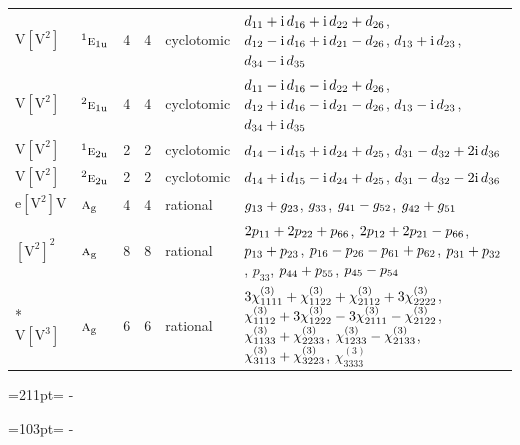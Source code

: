 \documentclass[10pt,a4paper]{article}
\newcommand{\needspace}[1]{\par\penalty-100\begingroup\dimen0=#1\relax\dimen2=\pagegoal
  \advance\dimen2-\pagetotal\ifdim\dimen0>\dimen2\relax\ifdim\dimen2>0pt\vfil\break\fi\fi
  \endgroup}
\numberwithin{equation}{section}
\newcommand{\irr}[1]{\text{\normalfont\scshape #1}}
\newcommand{\conjpair}[1]{{}^{#1}}
\newcommand{\ptag}[1]{\mathrm{#1}}
\newcommand{\iunit}{\mathrm{i}}
\newcommand{\jahn}[1]{\mathrm{#1}}
\newlength{\fillwidth}\newlength{\cellwidth}\newlength{\colwidth}
\newcommand{\signbreak}{\penalty100\relax}
\begin{document}
{\begin{longtable}{@{}llrrl>{\RaggedRight\arraybackslash}p{\fillwidth}@{}}
$\jahn{V[V^{2}]}$ & $\conjpair{1}\irr{e}_{1\ptag{u}}$ & 4 & 4 & cyclotomic & $d_{11} +\signbreak \iunit{}\,d_{16} +\signbreak \iunit{}\,d_{22} +\signbreak d_{26}$, $d_{12} -\signbreak \iunit{}\,d_{16} +\signbreak \iunit{}\,d_{21} -\signbreak d_{26}$, $d_{13} +\signbreak \iunit{}\,d_{23}$, $d_{34} -\signbreak \iunit{}\,d_{35}$\\
$\jahn{V[V^{2}]}$ & $\conjpair{2}\irr{e}_{1\ptag{u}}$ & 4 & 4 & cyclotomic & $d_{11} -\signbreak \iunit{}\,d_{16} -\signbreak \iunit{}\,d_{22} +\signbreak d_{26}$, $d_{12} +\signbreak \iunit{}\,d_{16} -\signbreak \iunit{}\,d_{21} -\signbreak d_{26}$, $d_{13} -\signbreak \iunit{}\,d_{23}$, $d_{34} +\signbreak \iunit{}\,d_{35}$\\
$\jahn{V[V^{2}]}$ & $\conjpair{1}\irr{e}_{2\ptag{u}}$ & 2 & 2 & cyclotomic & $d_{14} -\signbreak \iunit{}\,d_{15} +\signbreak \iunit{}\,d_{24} +\signbreak d_{25}$, $d_{31} -\signbreak d_{32} +\signbreak 2\iunit{}\,d_{36}$\\
$\jahn{V[V^{2}]}$ & $\conjpair{2}\irr{e}_{2\ptag{u}}$ & 2 & 2 & cyclotomic & $d_{14} +\signbreak \iunit{}\,d_{15} -\signbreak \iunit{}\,d_{24} +\signbreak d_{25}$, $d_{31} -\signbreak d_{32} -\signbreak 2\iunit{}\,d_{36}$\\
$\jahn{e[V^{2}]V}$ & $\irr{a}_{\ptag{g}}$ & 4 & 4 & rational & $\mathnormal{g}_{13} +\signbreak \mathnormal{g}_{23}$, $\mathnormal{g}_{33}$, $\mathnormal{g}_{41} -\signbreak \mathnormal{g}_{52}$, $\mathnormal{g}_{42} +\signbreak \mathnormal{g}_{51}$\\
$\jahn{[V^{2}]^{2}}$ & $\irr{a}_{\ptag{g}}$ & 8 & 8 & rational & $2p_{11} +\signbreak 2p_{22} +\signbreak p_{66}$, $2p_{12} +\signbreak 2p_{21} -\signbreak p_{66}$, $p_{13} +\signbreak p_{23}$, $p_{16} -\signbreak p_{26} -\signbreak p_{61} +\signbreak p_{62}$, $p_{31} +\signbreak p_{32}$, $p_{33}$, $p_{44} +\signbreak p_{55}$, $p_{45} -\signbreak p_{54}$\\*
$\jahn{V[V^{3}]}$ & $\irr{a}_{\ptag{g}}$ & 6 & 6 & rational & $3\chi^{(3)}_{1111} +\signbreak \chi^{(3)}_{1122} +\signbreak \chi^{(3)}_{2112} +\signbreak 3\chi^{(3)}_{2222}$, $\chi^{(3)}_{1112} +\signbreak 3\chi^{(3)}_{1222} -\signbreak 3\chi^{(3)}_{2111} -\signbreak \chi^{(3)}_{2122}$, $\chi^{(3)}_{1133} +\signbreak \chi^{(3)}_{2233}$, $\chi^{(3)}_{1233} -\signbreak \chi^{(3)}_{2133}$, $\chi^{(3)}_{3113} +\signbreak \chi^{(3)}_{3223}$, $\chi^{(3)}_{3333}$\\
\bottomrule\end{longtable}}
\needspace{211pt}
\needspace{103pt}
\end{document}
